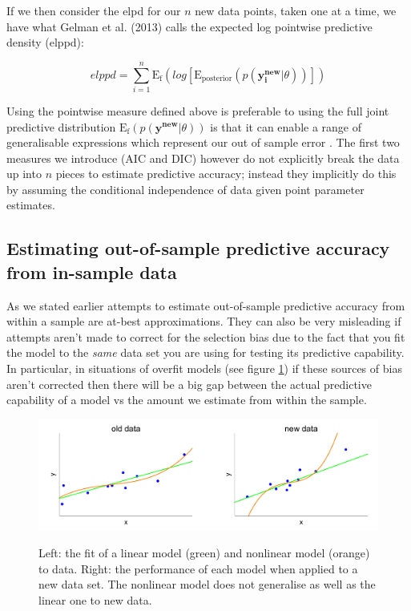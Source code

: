 \documentclass[11pt,fullpage]{book}
\begin{document}
If we then consider the elpd for our $n$ new data points, taken one at a time, we have what Gelman  et al. (2013) calls the expected log pointwise predictive density (elppd):

\begin{equation}\label{eq:Evaluation_elppd}
elppd = \sum\limits_{i=1}^{n} \mathrm{E_f}(log\left[\mathrm{E_{posterior}}(p(\boldsymbol{y^{new}_i}|\theta))\right])
\end{equation}

Using the pointwise measure defined above is preferable to using the full joint predictive distribution $\mathrm{E_f}\left(p(\boldsymbol{y^{new}}|\theta)\right)$ is that it can enable a range of generalisable expressions which represent our out of sample error \cite{gelman2013bayesian}. The first two measures we introduce (AIC and DIC) however do not explicitly break the data up into $n$ pieces to estimate predictive accuracy; instead they implicitly do this by assuming the conditional independence of data given point parameter estimates.

\subsection{Estimating out-of-sample predictive accuracy from in-sample data}
As we stated earlier attempts to estimate out-of-sample predictive accuracy from within a sample are at-best approximations. They can also be very misleading if attempts aren't made to correct for the selection bias due to the fact that you fit the model to the \textit{same} data set you are using for testing its predictive capability. In particular, in situations of overfit models (see figure \ref{fig:Evaluation_overfit}) if these sources of bias aren't corrected then there will be a big gap between the actual predictive capability of a model vs the amount we estimate from within the sample.

\begin{figure}
\centering
\scalebox{0.5} 
{\includegraphics{Evaluation_overfit.pdf}}
\caption{Left: the fit of a linear model (green) and nonlinear model (orange) to data. Right: the performance of each model when applied to a new data set. The nonlinear model does not generalise as well as the linear one to new data.}\label{fig:Evaluation_overfit}
\end{figure}
\end{document}
